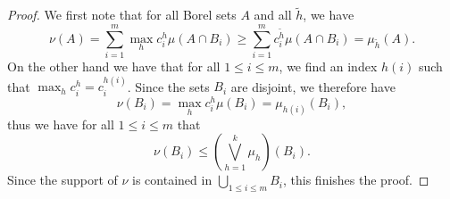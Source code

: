 \begin{proof}
	We first note that for all Borel sets $ A $ and all $ \tilde{h} $, we have
	\begin{equation*}
		\nu ( A ) 
		=
		\sum_{ i = 1 }^{ m }
		\max_{ h }	
		c_{ i }^{ h }
		\mu ( A \cap B_{ i } ) 
		\geq
		\sum_{ i = 1 }^{ m }
		c_{ i }^{ \tilde{ h } }
		\mu ( A \cap B_{ i } )
		=
		\mu_{ \tilde{ h } } ( A ).
	\end{equation*}
	On the other hand we have that for all $ 1 \leq i \leq m $, we find an 
	index $ h( i ) $ such that
	$ \max_{ h } c_{ i }^{ h } = c_{ i }^{ h( i ) } $.
	Since the sets $ B_{ i } $ are disjoint, we therefore have 
	\begin{equation*}
		\nu ( B_{ i } ) = \max_{ h } c_{ i }^{ h } \mu ( B_{ i } )
		= \mu_{ h ( i ) } ( B_{ i } ),
	\end{equation*}
	thus we have for all $ 1 \leq i \leq m $ that
	\begin{equation*}
		\nu ( B_{ i } ) 
		\leq
		\left(
		\bigvee_{ h = 1 }^{ k }
		\mu_{ h }
		\right) ( B_{ i } ).
	\end{equation*}
	Since the support of $ \nu $ is contained in $ \bigcup_{ 1 \leq i \leq m } B_{ i } $, this finishes the proof.
\end{proof}